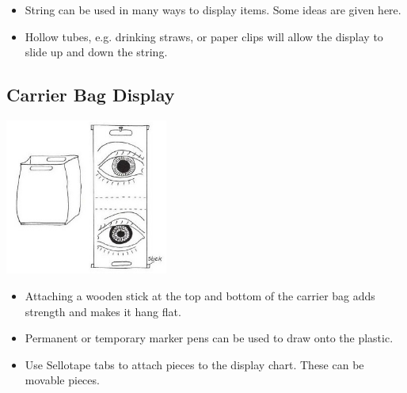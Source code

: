 \begin{multicols}{2}
\begin{itemize}
\item String can be used in many ways to display items. Some ideas are given here.
\item Hollow tubes, e.g. drinking
straws, or paper clips will allow
the display to slide up and
down the string.
\end{itemize}

\subsection{Carrier Bag Display}

\begin{center}
\includegraphics[width=0.4\textwidth]{./img/vso/carrier-bag.jpg}
\end{center}

\begin{itemize}
\item Attaching a wooden stick at the
top and bottom of the carrier
bag adds strength and makes it
hang flat.
\item Permanent or temporary marker pens can be
used to draw onto the plastic.
\item Use Sellotape tabs to attach
pieces to the display chart.
These can be movable pieces.
\end{itemize}


%



\end{multicols}
